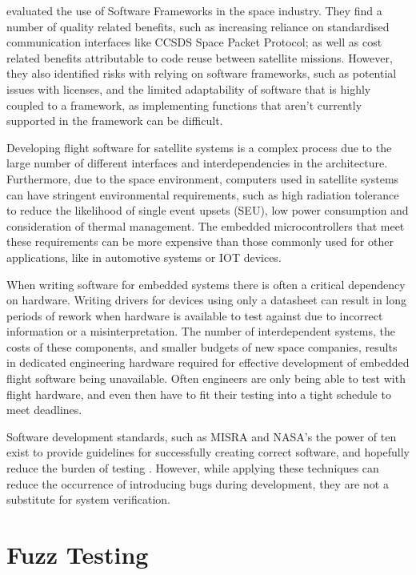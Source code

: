 \documentclass[../report.tex]{subfiles}
\begin{document}
\citet{Farges_2022} evaluated the use of Software Frameworks in the space
industry. They find a number of quality related benefits, such as increasing
reliance on standardised communication interfaces like CCSDS Space Packet
Protocol; as well as cost related benefits attributable to code reuse between
satellite missions. However, they also identified risks with relying on software
frameworks, such as potential issues with licenses, and the limited
adaptability of software that is highly coupled to a framework, as implementing
functions that aren't currently supported in the framework can be difficult.

Developing flight software for satellite systems is a complex process due to
the large number of different interfaces and interdependencies in the
architecture. Furthermore, due to the space environment, computers used in
satellite systems can have stringent environmental requirements, such as high
radiation tolerance to reduce the likelihood of single event upsets (SEU), low
power consumption and consideration of thermal management. The embedded
microcontrollers that meet these requirements can be more expensive than those
commonly used for other applications, like in automotive systems or IOT devices.

When writing software for embedded systems there is often a critical dependency
on hardware. Writing drivers for devices using only a datasheet can result in
long periods of rework when hardware is available to test against due to
incorrect information or a misinterpretation. The number of interdependent
systems, the costs of these components, and smaller budgets of new space
companies, results in dedicated engineering hardware required for effective
development of embedded flight software being unavailable. Often engineers are
only being able to test with flight hardware, and even then have to fit their
testing into a tight schedule to meet deadlines.

Software development standards, such as MISRA and NASA's the power of ten exist
to provide guidelines for successfully creating correct software, and hopefully
reduce the burden of testing \citep{NASA_10}. However, while applying these
techniques can reduce the occurrence of introducing bugs during development,
they are not a substitute for system verification.

\section{Fuzz Testing} \label{sec:lit-rev:fuzz}
\end{document}
